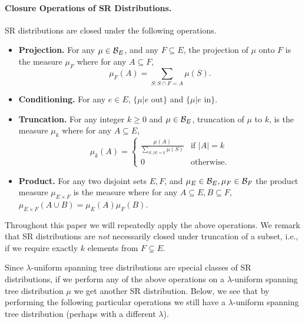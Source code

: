 \paragraph{Closure Operations of SR Distributions.}
SR distributions are closed under the following operations.

\begin{itemize}
	\item {\bf Projection.} For any $\mu\in {\cal B}_E$, and any $F\subseteq E$, the projection of $\mu$ onto $F$ is the measure $\mu_F$
	where for any $A\subseteq F$,
	$$ \mu_F(A)=\sum_{S: S\cap F=A} \mu(S).$$
	\item {\bf Conditioning.} For any $e\in E$, $\{\mu | e \text{ out}\}$ and $\{\mu | e \text{ in}\}$.
	\item {\bf Truncation.} For any integer $k\geq 0$ and $\mu\in {\cal B}_E$, truncation of $\mu$ to $k$, is the measure $\mu_k$ where for any $A\subseteq E$,
$$ \mu_k(A)=\begin{cases} \frac{\mu(A)}{\sum_{S:|S|=k} \mu(S)} & \text{if } |A|=k\\ 0 & \text{otherwise.}\end{cases}$$
	\item {\bf Product.} For any two disjoint sets $E,F$, and $\mu_E\in {\cal B}_E,\mu_F\in{\cal B}_F$ the product measure $\mu_{E\times F}$ is the measure where for any $A\subseteq E,B\subseteq F$, $\mu_{E\times F}(A\cup B)=\mu_E(A)\mu_F(B)$.
\end{itemize}
Throughout this paper we will repeatedly apply the above operations. 
We  remark that SR distributions are {\em not} necessarily closed under truncation of a subset, i.e., if we require exactly $k$ elements from $F\subsetneq E$.


Since $\lambda$-uniform spanning tree distributions are special classes of SR distributions, if we perform any of the above operations on a $\lambda$-uniform spanning tree distribution $\mu$ we get another SR distribution. Below, we see that by performing  the following particular operations we still have a $\lambda$-uniform spanning tree distribution (perhaps with a different $\lambda$). 
